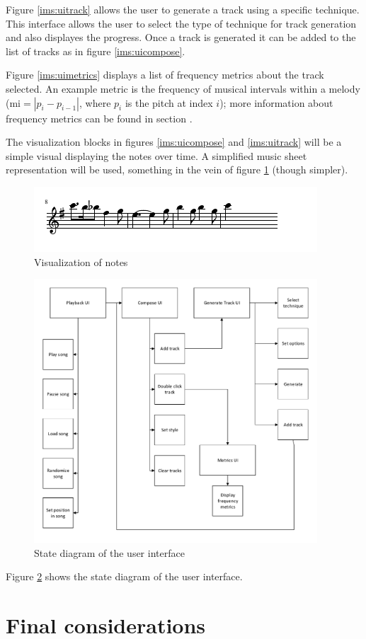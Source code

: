 Figure \ref{ims:uitrack} allows the user to generate a track using a specific technique. This interface allows the user to select the type of technique for track generation and also displayes the progress. Once a track is generated it can be added to the list of tracks as in figure \ref{ims:uicompose}.

Figure \ref{ims:uimetrics} displays a list of frequency metrics about the track selected. An example metric is the frequency of musical intervals within a melody ($\text{mi} = |p_i - p_{i-1}|$, where $p_i$ is the pitch at index $i$); more information about frequency metrics can be found in section \label{chap:metrics}.
 
The visualization blocks in figures \ref{ims:uicompose} and \ref{ims:uitrack} will be a simple visual displaying the notes over time. A simplified music sheet representation will be used, something in the vein of figure \ref{ims:uiharrymusicsheet} (though simpler).

\begin{figure}
\centerline{\includegraphics[width=400px]{../images/ui_visualization.pdf}}
\caption{Visualization of notes}
\label{ims:uiharrymusicsheet}
\end{figure}


\begin{figure}
\centerline{\includegraphics[width=400px]{../images/ui_control_blockdiagram.pdf}}
\caption{State diagram of the user interface}
\label{ims:uiflow}
\end{figure}

Figure \ref{ims:uiflow} shows the state diagram of the user interface.


\chapter{Final considerations}